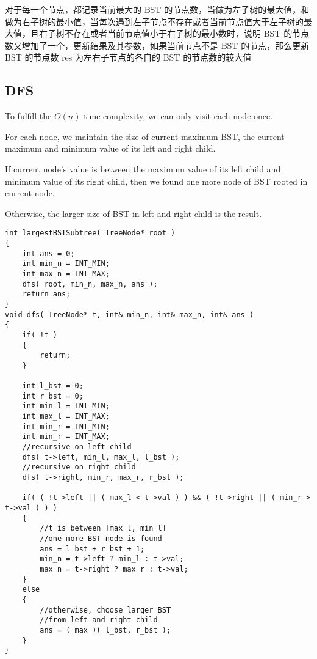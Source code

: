 对于每一个节点，都记录当前最大的 BST 的节点数，当做为左子树的最大值，和做为右子树的最小值，当每次遇到左子节点不存在或者当前节点值大于左子树的最大值，且右子树不存在或者当前节点值小于右子树的最小数时，说明 BST 的节点数又增加了一个，更新结果及其参数，如果当前节点不是 BST 的节点，那么更新 BST 的节点数 res 为左右子节点的各自的 BST 的节点数的较大值
\subsection{DFS}
To fulfill the $O(n)$ time complexity, we can only visit each node once. 

For each node, we maintain the size of current maximum BST, the current maximum and minimum value of its left and right child. 

If current node's value is between the maximum value of its left child and minimum value of its right child, then we found one more node of BST rooted in current node. 

Otherwise, the larger size of BST in left and right child is the result.

\setcounter{lstlisting}{0}
\begin{lstlisting}[style=customc, caption={DFS}]
int largestBSTSubtree( TreeNode* root )
{
    int ans = 0;
    int min_n = INT_MIN;
    int max_n = INT_MAX;
    dfs( root, min_n, max_n, ans );
    return ans;
}
void dfs( TreeNode* t, int& min_n, int& max_n, int& ans )
{
    if( !t )
    {
        return;
    }

    int l_bst = 0;
    int r_bst = 0;
    int min_l = INT_MIN;
    int max_l = INT_MAX;
    int min_r = INT_MIN;
    int min_r = INT_MAX;
    //recursive on left child
    dfs( t->left, min_l, max_l, l_bst );
    //recursive on right child
    dfs( t->right, min_r, max_r, r_bst );

    if( ( !t->left || ( max_l < t->val ) ) && ( !t->right || ( min_r > t->val ) ) )
    {
        //t is between [max_l, min_l]
        //one more BST node is found
        ans = l_bst + r_bst + 1;
        min_n = t->left ? min_l : t->val;
        max_n = t->right ? max_r : t->val;
    }
    else
    {
        //otherwise, choose larger BST
        //from left and right child
        ans = ( max )( l_bst, r_bst );
    }
}
\end{lstlisting}